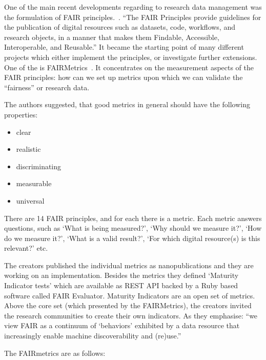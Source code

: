 One of the main recent developments regarding to research data management was the formulation of FAIR principles.~\cite{wilkinson2016}. ``The FAIR Principles provide guidelines for the publication of digital resources such as datasets, code, workflows, and research objects, in a manner that makes them Findable, Accessible, Interoperable, and Reusable.'' It became the starting point of many different projects which either implement the principles, or investigate further extensions. One of the is FAIRMetrics~\cite{wilkinson2018, fairmetrics}. It concentrates on the measurement aspects of the FAIR principles: how can we set up metrics upon which we can validate the ``fairness'' or research data.

The authors suggested, that good metrics in general should have the following properties:

\begin{itemize}
 \setlength{\parskip}{0pt}
 \setlength{\itemsep}{0pt plus 1pt}
 \item clear
 \item realistic
 \item discriminating
 \item measurable
 \item universal
\end{itemize}

There are 14 FAIR principles, and for each there is a metric. Each metric answers questions, such as `What is being measured?', `Why should we measure it?', `How do we measure it?', `What is a valid result?', `For which digital resource(s) is this relevant?' etc.

The creators published the individual metrics as nanopublications and they are working on an implementation. Besides the metrics they defined `Maturity Indicator tests' which are available as REST API backed by a Ruby based software called FAIR Evaluator. Maturity Indicators are an open set of metrics. Above the core set (which presented by the FAIRMetrics), the creators invited the research communities to create their own indicators. As they emphasise: ``we view FAIR as a continuum of `behaviors' exhibited by a data resource that increasingly enable machine discoverability and (re)use.''

The FAIRmetrics are as follows:


